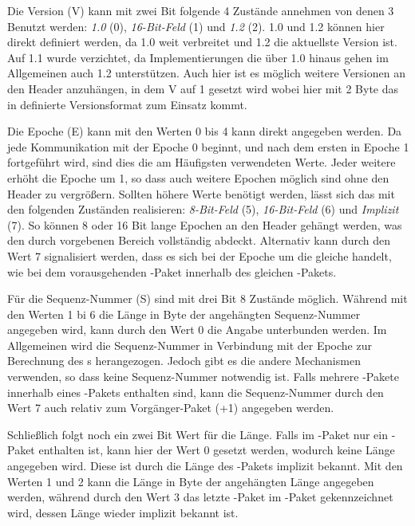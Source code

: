 Die Version (V) kann mit zwei Bit folgende 4 Zustände annehmen von denen 3 Benutzt werden: \textit{ 1.0} (0), \textit{16-Bit-Feld} (1) und
\textit{ 1.2} (2).  1.0 und  1.2 können hier direkt definiert werden, da  1.0 weit verbreitet
 und  1.2 die aktuellste Version ist. Auf  1.1 wurde verzichtet, da Implementierungen die über  1.0 hinaus gehen im Allgemeinen auch
 1.2 unterstützen. Auch hier ist es möglich weitere Versionen an den Header anzuhängen, in dem V auf 1 gesetzt wird wobei hier mit 2 Byte das in 
definierte Versionsformat zum Einsatz kommt.

Die Epoche (E) kann mit den Werten 0 bis 4 kann direkt angegeben werden. Da jede Kommunikation mit der Epoche 0 beginnt, und
nach dem ersten  in Epoche 1 fortgeführt wird, sind dies die am Häufigsten verwendeten Werte. Jeder weitere  erhöht die Epoche um 1, so dass auch
weitere Epochen möglich sind ohne den Header zu vergrößern. Sollten höhere Werte benötigt werden, lässt sich das mit den folgenden Zuständen realisieren:
\textit{8-Bit-Feld} (5), \textit{16-Bit-Feld} (6) und \textit{Implizit} (7). So können 8 oder 16 Bit lange Epochen an den Header gehängt werden, was den
durch  vorgebenen Bereich vollständig abdeckt. Alternativ kann durch den Wert 7 signalisiert werden, dass es sich bei der Epoche um die gleiche
handelt, wie bei dem vorausgehenden -Paket innerhalb des gleichen -Pakets.

Für die Sequenz-Nummer (S) sind mit drei Bit 8 Zustände möglich. Während mit den Werten 1 bi 6 die Länge in Byte der angehängten Sequenz-Nummer angegeben wird,
kann durch den Wert 0 die Angabe unterbunden werden. Im Allgemeinen wird die Sequenz-Nummer in Verbindung mit der Epoche zur Berechnung des s herangezogen.
Jedoch gibt es  die andere Mechanismen verwenden, so dass keine Sequenz-Nummer notwendig ist. Falls mehrere -Pakete innerhalb eines
-Pakets enthalten sind, kann die Sequenz-Nummer durch den Wert 7 auch relativ zum Vorgänger-Paket (+1) angegeben werden.

Schließlich folgt noch ein zwei Bit Wert für die Länge. Falls im -Paket nur ein -Paket enthalten ist, kann hier der Wert 0 gesetzt werden, wodurch
keine Länge angegeben wird. Diese ist durch die Länge des -Pakets implizit bekannt. Mit den Werten 1 und 2 kann die Länge in Byte der angehängten Länge
angegeben werden, während durch den Wert 3 das letzte -Paket im -Paket gekennzeichnet wird, dessen Länge wieder implizit bekannt ist.